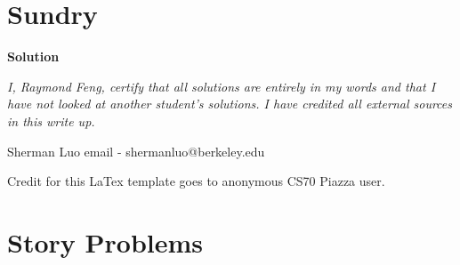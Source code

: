 \documentclass[11pt]{article}
\newcommand*{\Question}[1]{\section{#1}}
\begin{document}
\Question{Sundry} 
\vspace{10pt}
\begin{mdframed} \textbf{Solution} 
\item \textit {I, Raymond Feng, certify that all solutions are entirely in my words and that I have not looked at another student's solutions. I have credited all external sources in this write up.}
\item Sherman Luo email - shermanluo@berkeley.edu
\item Credit for this LaTex template goes to anonymous CS70 Piazza user.
\end{mdframed}
\vfill\pagebreak[3]

\Question{Story Problems}
\end{document}
